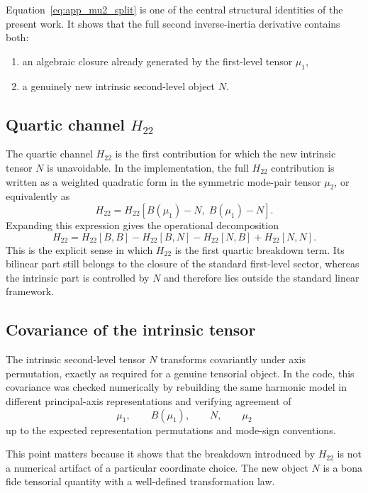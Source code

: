 \documentclass[journal=jacsat,manuscript=article]{achemso}
\begin{document}
Equation~\eqref{eq:app_mu2_split} is one of the central structural identities of
the present work. It shows that the full second inverse-inertia derivative
contains both:
\begin{enumerate}
\item an algebraic closure already generated by the first-level tensor $\mu_1$,
\item a genuinely new intrinsic second-level object $N$.
\end{enumerate}

\subsection{Quartic channel \texorpdfstring{$H_{22}$}{H22}}

The quartic channel $H_{22}$ is the first contribution for which the new
intrinsic tensor $N$ is unavoidable. In the implementation, the full $H_{22}$
contribution is written as a weighted quadratic form in the symmetric mode-pair
tensor $\mu_2$, or equivalently as
\begin{equation}
H_{22} = H_{22}[B(\mu_1)-N,\;B(\mu_1)-N].
\end{equation}
Expanding this expression gives the operational decomposition
\begin{equation}
H_{22}
=
H_{22}[B,B]
-H_{22}[B,N]
-H_{22}[N,B]
+H_{22}[N,N].
\end{equation}
This is the explicit sense in which $H_{22}$ is the first quartic breakdown
term. Its bilinear part still belongs to the closure of the standard
first-level sector, whereas the intrinsic part is controlled by $N$ and
therefore lies outside the standard linear framework.

\subsection{Covariance of the intrinsic tensor}

The intrinsic second-level tensor $N$ transforms covariantly under axis
permutation, exactly as required for a genuine tensorial object. In the code,
this covariance was checked numerically by rebuilding the same harmonic model in
different principal-axis representations and verifying agreement of
\begin{equation}
\mu_1,\qquad B(\mu_1),\qquad N,\qquad \mu_2
\end{equation}
up to the expected representation permutations and mode-sign conventions.

This point matters because it shows that the breakdown introduced by $H_{22}$
is not a numerical artifact of a particular coordinate choice. The new object
$N$ is a bona fide tensorial quantity with a well-defined transformation law.
\end{document}
